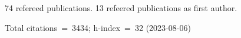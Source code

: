 74 refereed publications. 13 refeered publications as first author.

Total citations~=~3434; h-index~=~32 (2023-08-06)